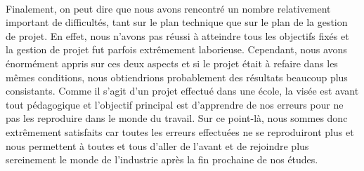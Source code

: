 \paragraph{} Finalement, on peut dire que nous avons rencontré un nombre relativement important de difficultés, tant sur le plan technique que sur le plan de la gestion de projet. En effet, nous n'avons pas réussi à atteindre tous les objectifs fixés et la gestion de projet fut parfois extrêmement laborieuse. Cependant, nous avons énormément appris sur ces deux aspects et si le projet était à refaire dans les mêmes conditions, nous obtiendrions probablement des résultats beaucoup plus consistants. Comme il s'agit d'un projet effectué dans une école, la visée est avant tout pédagogique et l'objectif principal est d'apprendre de nos erreurs pour ne pas les reproduire dans le monde du travail. Sur ce point-là, nous sommes donc extrêmement satisfaits car toutes les erreurs effectuées ne se reproduiront plus et nous permettent à toutes et tous d'aller de l'avant et de rejoindre plus sereinement le monde de l'industrie après la fin prochaine de nos études.
